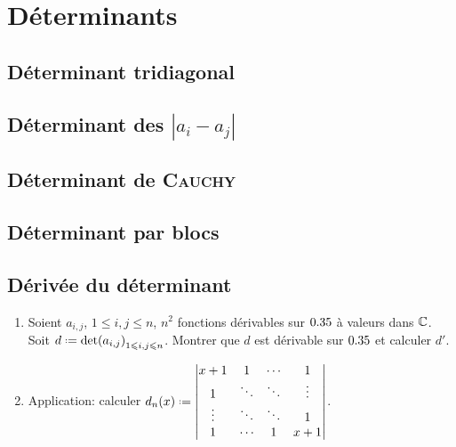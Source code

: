 \chapter{Déterminants}



\newpage

\section{Déterminant tridiagonal}


\section{Déterminant des \texorpdfstring{$|a_i - a_j|$}{|a_i - a_j|}}


\section{Déterminant de \textsc{Cauchy}}


\section{Déterminant par blocs}


\section{Dérivée du déterminant}
\begin{exercice}
    \begin{enumerate}
        \item Soient $a_{i,j}$, $1 \leqslant i, j \leqslant n$, $n^2$ fonctions dérivables sur $0.35$ à valeurs dans $\mathbb{C}$. Soit $d \defeq \det(a_{i,j})_{1 \leqslant i, j \leqslant n}$. Montrer que $d$ est dérivable sur $0.35$ et calculer $d'$.
        \item Application: calculer
        $
        d_n(x) \defeq
        \begin{vmatrix}
            x+1 & 1 & \cdots & 1 \\
            1 & \ddots & \ddots & \vdots \\
            \vdots & \ddots & \ddots & 1 \\
            1 & \cdots & 1 & x+1
        \end{vmatrix}
        $.
    \end{enumerate}
\end{exercice}

